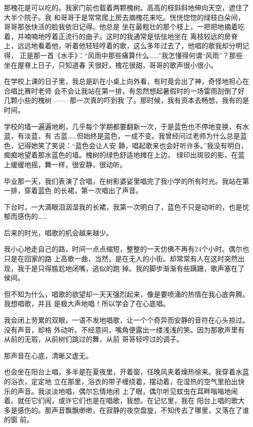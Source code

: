 \documentclass[12pt,a4paper]{article}
\begin{document}
		那槐花是可以吃的。我家门前也载着两颗槐树。高高的枝斜斜地伸向天空，遮住了大半个院子。我
	和哥哥于是常常爬上房去摘槐花来吃。恍恍惚惚的绿枝白朵间，哥哥那张快活的脸我依旧记得。他总是
	坐在最粗壮的那个枝上，一把把地摘着吃着，并喃喃地哼着正流行的曲子。这时的我通常是怯怯地坐在
	离枝较远的房脊上，远远地看着他，听着他轻轻哼着的歌，这么多年过去了，他唱的歌我却分明记得，
	正是那一首《水手》：“风雨中那些痛算什么……”我怎懂得何谓“风雨”？那些坐在屋脊上日子，只知道春
	天很好，槐花很甜，哥哥的歌声很小很小。

		在学校上课的日子里，我总是趴在小桌上向外看，有时竟会出了神，奇怪地担心在合唱比赛时老师
	会不会让我站在第一排，有忽然想起暑假时的一场雷雨刮倒了好几颗小些的槐树 —— 那一次真的吓到我
	了。那时候，我有资本去畅想，我有的是时间。

		学校的墙一遍遍地刷，几乎每个学期都要翻新一次，于是蓝色也不停地变换，有水蓝，有淡蓝，有
	古蓝……但始终是蓝色，一成不变。我曾经问过老师为什么总是蓝色，记得她笑了笑说：“蓝色会让人安
	静，唱起歌来也会好听许多。”我没有明白，痴痴地望着那水蓝色的墙。槐树的绿色舒适地摊在上边，
	绿印出斑驳的影，在蓝上缓缓地摇，舞一样，很安静，很动听。

		毕业那一天，我们表演了合唱，在树影婆娑里唱完了我小学的所有时光。我站在第一排，穿着蓝色
	的长裙，第一次唱出了声音。

		下台时，一大滴眼泪洇湿我的长裙，我第一次明白了，蓝色不只是动听的，也是忧郁而感伤的……

		后来的时光，唱歌的机会越来越少。

		我小心地走自己的路，时间一点点缩短，整整的一天仿佛不再有24个小时。偶尔也只是在回家的路
	上高歌一曲，当然，是在无人的小街。却常常有人在这时突然出现，我于是只得尴尬地闭嘴，逃似的跑
	掉。我的脚步渐渐有些蹒跚，歌声塞在了侯间。

		但不知为什么，唱歌的欲望却一天天强烈起来，像是要喷涌的热情在我心底奔腾。我想唱歌，并且
	是极大声地唱！所以学会了在心底唱。

		我会闭上劳累的双眼，一语不发地唱歌，让一个个奇异而安静的音符在心头掠过。没有声音，却格
	外动听。不经意间，嘴角便露出一缕浅浅的笑。因为那歌声里有从前的无瑕，从前树们跳过的舞，从前
	哥哥轻哼过的调子。

		那声音在心底，清晰又虚无。

		也会坐在阳台上唱，多半是在夏夜里，开着窗，任晚风夹着燥热徐来。我穿着水蓝的浴衣，定定地
	立在那里，浴衣的带子缠绕着，摆动着，在湿热的空气里拍出快乐的声音。我淡淡地唱，偶尔忘情地闭
	上了眼，偶尔听见蚊虫在耳畔嗡嗡地闹着。就任它们闹，或许它们也是在唱歌，我想。在记忆里，我在
	阳台上唱的歌大多是感伤的。那声音飘飘缈缈，在寂静的夜空盘旋，不知传去了哪里，又落在了谁的窗
	前。
\end{document}
